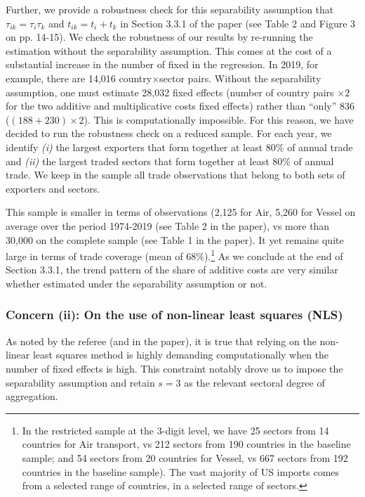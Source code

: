 \documentclass[a4paper,11pt]{article}
\begin{document}
Further, we provide a robustness check for this separability assumption that $\tau_{ik} = \tau_i\tau_{k}$ and
 $t_{ik} = t_i +t_k$ in Section 3.3.1 of the paper (see Table 2 and Figure 3 on pp. 14-15). We check the robustness of our results by re-running the estimation without the separability assumption. This comes at the cost of a substantial increase in the number of fixed in the regression. In 2019, for example, there are 14,016 country$\times$sector pairs. Without the separability assumption, one must estimate 28,032 fixed effects (number of country pairs $\times2$ for the two additive and multiplicative costs fixed effects) rather than ``only'' 836 ($(188+230)\times 2$). This is computationally impossible.
 For this reason, we have decided to run the robustness check on a reduced sample. For each year, we identify \textit{(i)} the largest exporters that form together at least 80\% of annual trade and \textit{(ii)} the largest traded sectors that form together at least 80\% of annual trade.
 We keep in the sample all trade observations that belong to both sets of exporters and sectors.

 This sample is smaller in terms of observations (2,125 for Air, 5,260 for Vessel on average over the period 1974-2019 (see Table 2 in the paper), vs more than 30,000 on the complete sample (see Table 1 in the paper). It yet remains quite large in terms of trade coverage (mean of 68\%).\footnote{In the restricted sample at the 3-digit level, we have 25 sectors from 14 countries for Air transport, vs 212 sectors from 190 countries in the baseline sample; and 54 sectors from 20 countries for Vessel, vs 667 sectors from 192 countries in the baseline sample). The vast majority of US imports comes from a selected range of countries, in a selected range of sectors.} As we conclude at the end of Section 3.3.1, the trend pattern of the share of additive costs are very similar whether estimated under the separability assumption or not.


\subsubsection{Concern (ii): On the use of non-linear least squares (NLS)} As noted by the referee (and in the paper), it is true that relying on the non-linear least squares method is highly demanding computationally when the number of fixed effects is high. This constraint notably drove us to impose the separability assumption and retain $s=3$ as the relevant sectoral degree of aggregation.
\end{document}
